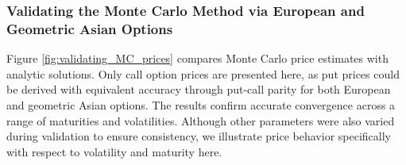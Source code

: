 \subsubsection{Validating the Monte Carlo Method via European and Geometric Asian Options}\label{sec:pricing_eu_geo_asian_options}

Figure \ref{fig:validating_MC_prices} compares Monte Carlo price estimates with analytic solutions. 
Only call option prices are presented here, as put prices could be derived with equivalent accuracy 
through put-call parity for both European and geometric Asian options. 
The results confirm accurate convergence across a range of maturities and volatilities. 
Although other parameters were also varied during validation to ensure consistency, we 
illustrate price behavior specifically with respect to volatility and maturity here.   


